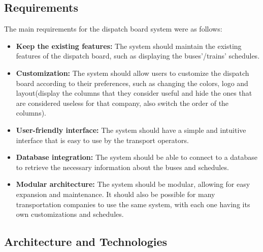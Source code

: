 \documentclass{article}
\begin{document}
\subsection{Requirements}
The main requirements for the dispatch board system were as follows:
\begin{itemize}
    \item     \textbf{Keep the existing features:} The system should maintain the existing features of the dispatch board, such as displaying the buses'/trains' schedules.
    \item     \textbf{Customization:} The system should allow users to customize the dispatch board according to their preferences, such as changing the colors, logo and layout(display the columns that they consider useful and hide the ones that are considered useless for that company, also switch the order of the columns).
    \item     \textbf{User-friendly interface:} The system should have a simple and intuitive interface that is easy to use by the transport operators.
    \item     \textbf{Database integration:} The system should be able to connect to a database to retrieve the necessary information about the buses and schedules.
    \item     \textbf{Modular architecture:} The system should be modular, allowing for easy expansion and maintenance. It should also be possible for many transportation companies to use the same system, with each one having its own customizations and schedules.
\end{itemize}

\subsection{Architecture and Technologies}


\printindex
\end{document}
